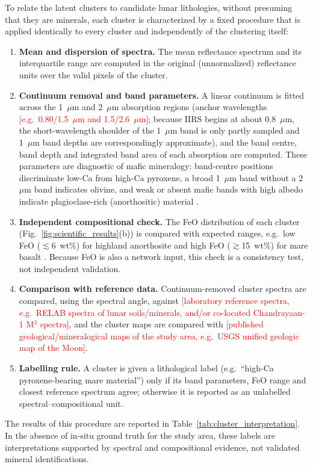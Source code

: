 \documentclass[pdflatex,sn-mathphys-num]{sn-jnl}
\newcommand{\fillin}[1]{\textcolor{red}{[#1]}}
\begin{document}
To relate the latent clusters to candidate lunar lithologies, without presuming that they are minerals, each cluster is characterized by a fixed procedure that is applied identically to every cluster and independently of the clustering itself:
\begin{enumerate}
\item \textbf{Mean and dispersion of spectra.} The mean reflectance spectrum and its interquartile range are computed in the original (unnormalized) reflectance units over the valid pixels of the cluster.
\item \textbf{Continuum removal and band parameters.} A linear continuum is fitted across the 1~$\mu$m and 2~$\mu$m absorption regions (anchor wavelengths \fillin{e.g.\ 0.80/1.5~$\mu$m and 1.5/2.6~$\mu$m}; because IIRS begins at about 0.8~$\mu$m, the short-wavelength shoulder of the 1~$\mu$m band is only partly sampled and 1~$\mu$m band depths are correspondingly approximate), and the band centre, band depth and integrated band area of each absorption are computed. These parameters are diagnostic of mafic mineralogy: band-centre positions discriminate low-Ca from high-Ca pyroxene, a broad 1~$\mu$m band without a 2~$\mu$m band indicates olivine, and weak or absent mafic bands with high albedo indicate plagioclase-rich (anorthositic) material \cite{Adams1974,Cloutis1991}.
\item \textbf{Independent compositional check.} The FeO distribution of each cluster (Fig.~\ref{fig:scientific_results}(b)) is compared with expected ranges, e.g.\ low FeO ($\lesssim$6~wt\%) for highland anorthosite and high FeO ($\gtrsim$15~wt\%) for mare basalt \cite{Lucey2000}. Because FeO is also a network input, this check is a consistency test, not independent validation.
\item \textbf{Comparison with reference data.} Continuum-removed cluster spectra are compared, using the spectral angle, against \fillin{laboratory reference spectra, e.g.\ RELAB spectra of lunar soils/minerals, and/or co-located Chandrayaan-1 M$^3$ spectra}, and the cluster maps are compared with \fillin{published geological/mineralogical maps of the study area, e.g.\ USGS unified geologic map of the Moon}.
\item \textbf{Labelling rule.} A cluster is given a lithological label (e.g.\ ``high-Ca pyroxene-bearing mare material'') only if its band parameters, FeO range and closest reference spectrum agree; otherwise it is reported as an unlabelled spectral--compositional unit.
\end{enumerate}
The results of this procedure are reported in Table~\ref{tab:cluster_interpretation}. In the absence of in-situ ground truth for the study area, these labels are interpretations supported by spectral and compositional evidence, not validated mineral identifications.
\end{document}
